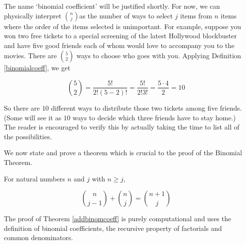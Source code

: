 \smallskip
 
The name `binomial coefficient' will be justified shortly.  For now, we can physically interpret $\binom{n}{j}$as the number of ways to select $j$ items from $n$ items where the order of the items selected is unimportant.   For example, suppose you won two free tickets to a special screening of the latest Hollywood blockbuster and have five good friends each of whom would love to accompany you to the movies.  There are $\binom{5}{2}$ ways to choose who goes with you.  Applying Definition \ref{binomialcoeff}, we get

\[ \binom{5}{2} = \dfrac{5!}{2! (5-2)!} = \dfrac{5!}{2! 3!} = \dfrac{5 \cdot 4}{2} = 10\] 

So there are $10$ different ways to distribute those two tickets among five friends. (Some will see it as $10$ ways to decide which three friends have to stay home.)  The reader is encouraged to verify this by actually taking the time to list all of the possibilities.  

\smallskip



We now state and prove a theorem which is crucial to the proof of the Binomial Theorem.

\smallskip

\colorbox{ResultColor}{\bbm

\begin{thm}  \label{addbinomcoeff}  For natural numbers $n$ and $j$ with $n \geq j$, 

\[ \binom{n}{j-1} + \binom{n}{j} = \binom{n+1}{j} \]



\end{thm}

\ebm}

\smallskip

The proof of Theorem \ref{addbinomcoeff} is purely computational and uses the definition of binomial coefficients, the recursive property of factorials and common denominators.

